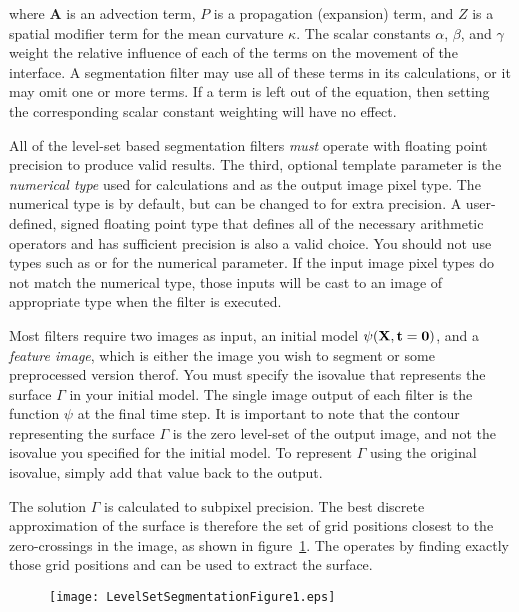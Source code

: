 where $\mathbf{A}$ is an advection term, $P$ is a propagation (expansion) term,
and $Z$ is a spatial modifier term for the mean curvature $\kappa$.  The scalar
constants $\alpha$, $\beta$, and $\gamma$ weight the relative influence of
each of the terms on the movement of the interface.  A segmentation filter may
use all of these terms in its calculations, or it may omit one or more terms.
If a term is left out of the equation, then setting the corresponding scalar
constant weighting will have no effect.

All of the level-set based segmentation filters \emph{must} operate with
floating point precision to produce valid results.  The third, optional
template parameter is the \emph{numerical type} used for calculations and as
the output image pixel type.  The numerical type is  by default,
but can be changed to  for extra precision.  A user-defined,
signed floating point type that defines all of the necessary arithmetic
operators and has sufficient precision is also a valid choice.  You should not
use types such as  or  for the numerical
parameter.  If the input image pixel types do not match the numerical type,
those inputs will be cast to an image of appropriate type when the filter is
executed.

Most filters require two images as input, an initial model $\psi(\bf{X}, t=0)$,
and a \emph{feature image}, which is either the image you wish to segment or
some preprocessed version therof.  You must specify the isovalue that
represents the surface $\Gamma$ in your initial model. The single image output of
each filter is the function $\psi$ at the final time step.  It is important to
note that the contour representing the surface $\Gamma$ is the zero level-set
of the output image, and not the isovalue you specified for the initial model.
To represent $\Gamma$ using the original isovalue, simply add that value back
to the output.

The solution $\Gamma$ is calculated to subpixel precision.  The best discrete
approximation of the surface is therefore the set of grid positions closest to
the zero-crossings in the image, as shown in
figure~\ref{fig:LevelSetSegmentationFigure1}.  The
 operates by finding exactly those grid 
positions and can be used to extract the surface. 

\begin{figure}
\centering
\texttt{[image: LevelSetSegmentationFigure1.eps]}
\protect\label{fig:LevelSetSegmentationFigure1}
\end{figure}

